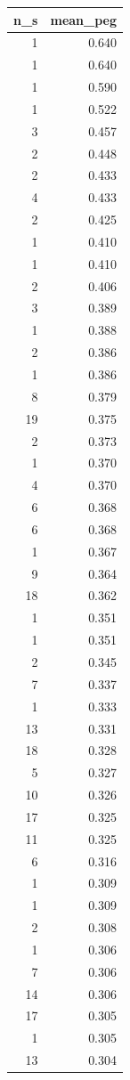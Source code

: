 \begin{tabular}{rr}
\toprule
n_s & mean_peg \\
\midrule
1 & 0.640 \\
1 & 0.640 \\
1 & 0.590 \\
1 & 0.522 \\
3 & 0.457 \\
2 & 0.448 \\
2 & 0.433 \\
4 & 0.433 \\
2 & 0.425 \\
1 & 0.410 \\
1 & 0.410 \\
2 & 0.406 \\
3 & 0.389 \\
1 & 0.388 \\
2 & 0.386 \\
1 & 0.386 \\
8 & 0.379 \\
19 & 0.375 \\
2 & 0.373 \\
1 & 0.370 \\
4 & 0.370 \\
6 & 0.368 \\
6 & 0.368 \\
1 & 0.367 \\
9 & 0.364 \\
18 & 0.362 \\
1 & 0.351 \\
1 & 0.351 \\
2 & 0.345 \\
7 & 0.337 \\
1 & 0.333 \\
13 & 0.331 \\
18 & 0.328 \\
5 & 0.327 \\
10 & 0.326 \\
17 & 0.325 \\
11 & 0.325 \\
6 & 0.316 \\
1 & 0.309 \\
1 & 0.309 \\
2 & 0.308 \\
1 & 0.306 \\
7 & 0.306 \\
14 & 0.306 \\
17 & 0.305 \\
1 & 0.305 \\
13 & 0.304 \\

\end{tabular}
